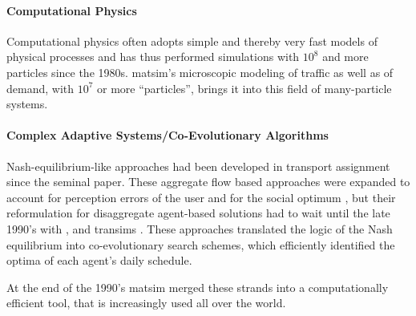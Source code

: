 



\paragraph{Computational Physics} Computational physics often adopts simple and thereby very fast models of physical processes and has thus performed simulations with $10^8$ and more particles since the 1980s.
\gls{matsim}'s microscopic modeling of traffic as well as of demand, with $10^7$ or more ``particles'', brings it into this field of many-particle systems. %

\paragraph{Complex Adaptive Systems/Co-Evolutionary Algorithms}
Nash-equilibrium-like approaches had been developed in transport assignment since the seminal \citet[][]{Wardrop_PICE_1952} paper. These aggregate flow based approaches were expanded to account for perception errors of the user and for the social optimum \citep[see][]{DaganzoSheffi_TransScience_1977}, but their reformulation for disaggregate agent-based solutions had to wait until the late 1990’s with \citet{Nagel1995phd,Nagel1996NRW, Gawron_IJMPC_1998}, and \gls{transims} \citep[][]{SmithEtc1995TRANSIMSSeattle}. These approaches translated the logic of the Nash equilibrium
into co-evolutionary search schemes, which efficiently identified the optima of each agent’s daily schedule.

At the end of the 1990’s \gls{matsim} merged these strands into a computationally efficient tool, that is increasingly used all over the world.

